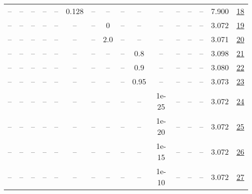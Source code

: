 \begin{table}[H]
\begin{tabular}{cccccccccccccccc}
-- & -- & -- & -- & -- & 0.128 & -- & -- & -- & -- & -- & -- & -- & -- & 7.900 & \href{https://wandb.ai/stanford-mercury/optimizer-scaling/runs/sweep-520m-10B-muon16543clr0.128-wd0.1-minlr0-warmup0-b10.8-b20.-225a93}{18} \\
-- & -- & -- & -- & -- & -- & -- & 0 & -- & -- & -- & -- & -- & -- & 3.072 & \href{https://wandb.ai/stanford-mercury/optimizer-scaling/runs/sweep-520m-10B-muon3a141elr0.008-wd0.1-minlr0-warmup0-b10.8-b20.-7c2cc6}{19} \\
-- & -- & -- & -- & -- & -- & -- & 2.0 & -- & -- & -- & -- & -- & -- & 3.071 & \href{https://wandb.ai/stanford-mercury/optimizer-scaling/runs/sweep-520m-10B-muonc564eblr0.008-wd0.1-minlr0-warmup0-b10.8-b20.-bfe40c}{20} \\
-- & -- & -- & -- & -- & -- & -- & -- & -- & 0.8 & -- & -- & -- & -- & 3.098 & \href{https://wandb.ai/stanford-mercury/optimizer-scaling/runs/sweep-520m-10B-muon21d94elr0.008-wd0.1-minlr0-warmup0-b10.8-b20.-f4bbef}{21} \\
-- & -- & -- & -- & -- & -- & -- & -- & -- & 0.9 & -- & -- & -- & -- & 3.080 & \href{https://wandb.ai/stanford-mercury/optimizer-scaling/runs/sweep-520m-10B-muon1de198lr0.008-wd0.1-minlr0-warmup0-b10.8-b20.-2eb67f}{22} \\
-- & -- & -- & -- & -- & -- & -- & -- & -- & 0.95 & -- & -- & -- & -- & 3.073 & \href{https://wandb.ai/stanford-mercury/optimizer-scaling/runs/sweep-520m-10B-muon6f490clr0.008-wd0.1-minlr0-warmup0-b10.8-b20.-59ba2a}{23} \\
-- & -- & -- & -- & -- & -- & -- & -- & -- & -- & 1e-25 & -- & -- & -- & 3.072 & \href{https://wandb.ai/stanford-mercury/optimizer-scaling/runs/sweep-520m-10B-muon72cb00lr0.008-wd0.1-minlr0-warmup0-b10.8-b20.-700a79}{24} \\
-- & -- & -- & -- & -- & -- & -- & -- & -- & -- & 1e-20 & -- & -- & -- & 3.072 & \href{https://wandb.ai/stanford-mercury/optimizer-scaling/runs/sweep-520m-10B-muon3db195lr0.008-wd0.1-minlr0-warmup0-b10.8-b20.-ceaf52}{25} \\
-- & -- & -- & -- & -- & -- & -- & -- & -- & -- & 1e-15 & -- & -- & -- & 3.072 & \href{https://wandb.ai/stanford-mercury/optimizer-scaling/runs/sweep-520m-10B-muon83b024lr0.008-wd0.1-minlr0-warmup0-b10.8-b20.-06e1cd}{26} \\
-- & -- & -- & -- & -- & -- & -- & -- & -- & -- & 1e-10 & -- & -- & -- & 3.072 & \href{https://wandb.ai/stanford-mercury/optimizer-scaling/runs/sweep-520m-10B-muonc83f11lr0.008-wd0.1-minlr0-warmup0-b10.8-b20.-b70e12}{27} \\

\end{tabular}
\end{table}
